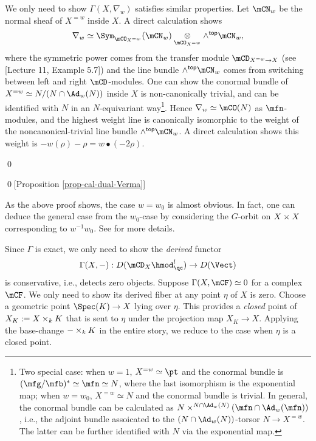 		We only need to show $\Gamma(X,\nabla_w)$ satisfies similar properties. Let $\mCN_w$ be the normal sheaf of $X^{=w}$ inside $X$. A direct calculation shows
		\[
			\nabla_w \simeq \Sym_{\mCO_{X^{=w}}} (\mCN_w) \ot_{\mCO_{X^{=w}}} \wedge^{\mathsf{top}} \mCN_w,
		\]
		where the symmetric power comes from the transfer module $\mCD_{ X^{=w} \to X }$ (see [Lecture 11, Example 5.7]) and the line bundle $\wedge^{\mathsf{top}} \mCN_w$ comes from switching between left and right $\mCD$-modules. One can show the conormal bundle of $X^{=w}\simeq N/(N\cap \Ad_w(N))$ inside $X$ is non-canonically trivial, and can be identified with $N$ in an $N$-equivariant way\footnote{Two special case: when $w=1$, $X^{=w}\simeq \pt$ and the conormal bundle is $(\mfg/\mfb)^*\simeq \mfn \simeq N$, where the last isomorphism is the exponential map; when $w=w_0$, $X^{=w}\simeq N$ and the conormal bundle is trivial. In general, the conormal bundle can be calculated as $N\mt^{N\cap \Ad_w(N)} (\mfn\cap \Ad_w(\mfn))$, i.e., the adjoint bundle assoicated to the $(N\cap \Ad_w(N))$-torsor $N\to X^{=w}$. The latter can be further identified with $N$ via the exponential map.}. Hence $\nabla_w\simeq \mCO(N)$ as $\mfn$-modules, and the highest weight line is canonically isomorphic to the weight of the noncanonical-trivial line bundle $\wedge^{\mathsf{top}} \mCN_w$. A direct calculation shows this weight is $-w(\rho)-\rho = w\bullet(-2\rho)$.



	\qed

		

	\qed[Proposition \ref{prop-cal-dual-Verma}]


	\begin{rem}
		As the above proof shows, the case $w=w_0$ is almost obvious. In fact, one can deduce the general case from the $w_0$-case by considering the $G$-orbit on $X\mt X$ corresponding to $w^{-1}w_0$. See \cite[Theorem 2.1]{S} for more details.
	\end{rem}



	

		Since $\Gamma$ is exact, we only need to show the \emph{derived} functor
		\[
			\Gamma(X,-): D(\mCD_{X} \hmod_\qc^l) \to D(\Vect)
		\]
		is conservative, i.e., detects zero objects. Suppose $\Gamma(X,\mCF)\simeq 0$ for a complex $\mCF$. We only need to show its derived fiber at any point $\eta$ of $X$ is zero. Choose a geometric point $\Spec (K) \to X$ lying over $\eta$. This provides a \emph{closed} point of $X_K:= X\mt_k K$ that is sent to $\eta$ under the projection map $X_K \to X$. Applying the base-change $-\mt_k K$ in the entire story, we reduce to the case when $\eta$ is a closed point. 

